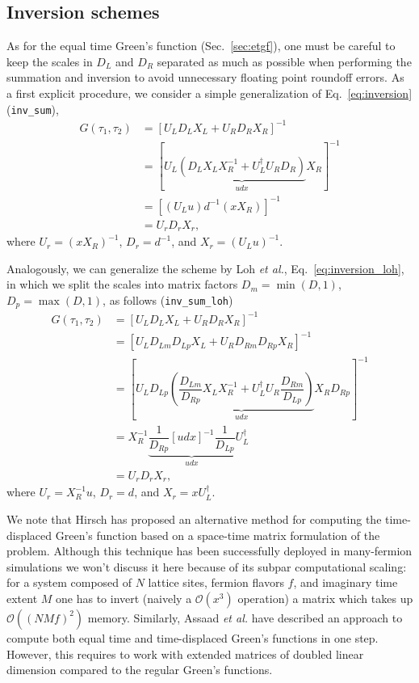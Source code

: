 \documentclass[submission, Phys]{SciPost}
\begin{document}
\subsection{Inversion schemes}
As for the equal time Green's function (Sec.~\ref{sec:etgf}), one must be careful to keep the scales in $D_L$ and $D_R$ separated as much as possible when performing the summation and inversion to avoid unnecessary floating point roundoff errors.
As a first explicit procedure, we consider a simple generalization of Eq.~\ref{eq:inversion} (\texttt{inv\_sum}),
\begin{align}
	G(\tau_1, \tau_2) &= [U_L D_L X_L + U_R D_R X_R]^{-1} \nonumber\\
	&= [U_L \underbrace{(D_L X_L X_R^{-1} + U_L^\dagger U_R D_R)}_{udx} X_R ]^{-1} \nonumber\\
	&= [(U_L u) d^{-1} (x X_R)]^{-1} \label{eq:inversion_tdgf}\\
	&= U_r D_r X_r, \nonumber 
\end{align}
where $U_r = (x X_R)^{-1}$, $D_r = d^{-1}$, and $X_r = (U_L u)^{-1}$.

Analogously, we can generalize the scheme by Loh \textit{et al.}\cite{Loh2005}, Eq.~\ref{eq:inversion_loh}, in which we split the scales into matrix factors $D_m = \min(D, 1)$, $D_p = \max(D, 1)$, as follows (\texttt{inv\_sum\_loh})
\begin{align}
	G(\tau_1, \tau_2) &= [U_L D_L X_L + U_R D_R X_R]^{-1} \nonumber\\
	&= [U_L D_{Lm} D_{Lp} X_L + U_R D_{Rm} D_{Rp} X_R]^{-1} \nonumber\\
	&= \left[U_L D_{Lp} \underbrace{\left( \dfrac{D_{Lm}}{D_{Rp}} X_L X_R^{-1} + U_L^\dagger U_R \dfrac{D_{Rm}}{D_{Lp}} \right)}_{udx} X_R D_{Rp} \right]^{-1} \nonumber\\
	&= X_R^{-1} \underbrace{\dfrac{1}{D_{Rp}} [udx]^{-1} \dfrac{1}{D_{Lp}}}_{udx} U_L^\dagger \label{eq:inversion_tdgf_loh} \\
	&= U_r D_r X_r, \nonumber
\end{align}
where $U_r = X_R^{-1} u$, $D_r = d$, and $X_r = x U_L^\dagger$.

We note that Hirsch\cite{Hirsch1988, Santos2003} has proposed an alternative method for computing the time-displaced Green's function based on a space-time matrix formulation of the problem. Although this technique has been successfully deployed in many-fermion simulations we won't discuss it here because of its subpar computational scaling: for a system composed of $N$ lattice sites, fermion flavors $f$, and imaginary time extent $M$ one has to invert (naively a $\mathcal{O}(x^3)$ operation) a matrix which takes up $\mathcal{O}((NMf)^2)$ memory. Similarly, Assaad \textit{et al.}\cite{Assaad2002a} have described an approach to compute both equal time and time-displaced Green's functions in one step. However, this requires to work with extended matrices of doubled linear dimension compared to the regular Green's functions.
\end{document}
